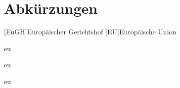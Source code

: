 \documentclass{article}
\begin{document}
\section*{Abkürzungen}
\begin{acronym}[EuGH]
[EuGH]{Europäischer Gerichtshof}
[EU]{Europäische Union}
\end{acronym}

\tableofcontents

\ac{eu}

\ac{eu}

\acf{eu}
\end{document}

